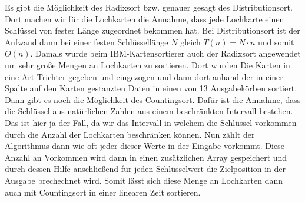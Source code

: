 \documentclass{article}
\begin{document}
Es gibt die Möglichkeit des Radixsort bzw. genauer gesagt des Distributionsort. Dort machen wir für die Lochkarten die Annahme, dass jede Lochkarte einen Schlüssel von fester Länge zugeordnet bekommen hat. Bei Distributionsort ist der Aufwand dann bei einer festen Schlüssellänge $N$ gleich $T(n)=N\cdot n$ und somit $O(n)$. Damals wurde beim IBM-Kartensortierer auch der Radixsort angewendet um sehr große Mengen an Lochkarten zu sortieren. Dort wurden Die Karten in eine Art Trichter gegeben und eingezogen und dann dort anhand der in einer Spalte auf den Karten gestanzten Daten in einen von 13 Ausgabekörben sortiert.\\
Dann gibt es noch die Möglichkeit des Countingsort. Dafür ist die Annahme, dass die Schlüssel aus natürlichen Zahlen aus einem beschränkten Intervall bestehen. Das ist hier ja der Fall, da wir das Intervall in welchem die Schlüssel vorkommen durch die Anzahl der Lochkarten beschränken können. Nun zählt der Algorithmus dann wie oft jeder dieser Werte in der Eingabe vorkommt. Diese Anzahl an Vorkommen wird dann in einen zusätzlichen Array gespeichert und durch dessen Hilfe anschließend für jeden Schlüsselwert die Zielposition in der Ausgabe brechechnet wird. Somit lässt sich diese Menge an Lochkarten dann auch mit Countingsort in einer linearen Zeit sortieren.
\end{document}
